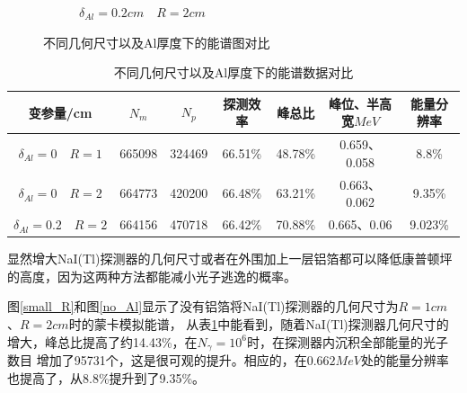 \documentclass{article}
\begin{document}
\begin{figure}[H]
\begin{subfigure}[b]{0.3\textwidth}
        \caption{$\delta _{Al}=0.2cm\quad R=2cm$}
        \label{Al}
    \end{subfigure}
    \caption{不同几何尺寸以及Al厚度下的能谱图对比}
\end{figure}

\begin{table}[h]
    \centering
    \caption{不同几何尺寸以及Al厚度下的能谱数据对比}
    \begin{tabular}{ccccccc}
        \hline
        变参量/cm & $N_m$ & $N_p$ & 探测效率 & 峰总比 & 峰位、半高宽$MeV$ &能量分辨率 \\
        \hline
        $\delta _{Al}=0\quad R=1$ & 665098 & 324469 & 66.51\% & 48.78\% & 0.659、0.058 &8.8\%  \\

        $\delta _{Al}=0\quad R=2$ & 664773 & 420200 & 66.48\% & 63.21\% & 0.663、0.062 &9.35\%  \\
        
        $\delta _{Al}=0.2\quad R=2$ & 664156 & 470718 & 66.42\% & 70.88\% & 0.665、0.06 &9.023\%  \\
        
        \hline
    \end{tabular}
    \label{3case1}
\end{table}

显然增大NaI(Tl)探测器的几何尺寸或者在外围加上一层铝箔都可以降低康普顿坪的高度，因为这两种方法都能减小光子逃逸的概率。

图\ref{small_R}和图\ref{no_Al}显示了没有铝箔将NaI(Tl)探测器的几何尺寸为$R=1cm$、$R=2cm$时的蒙卡模拟能谱，
从表\ref{3case1}中能看到，随着NaI(Tl)探测器几何尺寸的增大，峰总比提高了约14.43\%，在$N_{\gamma }=10^6$时，在探测器内沉积全部能量的光子数目
增加了95731个，这是很可观的提升。相应的，在$0.662MeV$处的能量分辨率也提高了，从8.8\%提升到了9.35\%。
\end{document}
